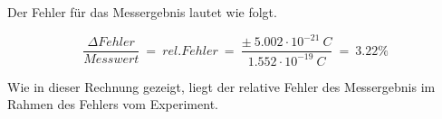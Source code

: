 \noindent Der Fehler für das Messergebnis lautet wie folgt.

$$
\frac{\Delta Fehler}{Messwert} \ = \ rel. Fehler \ = \ \frac{\pm \ 5.002 \cdot 10^{-21}\ C}{1.552 \cdot 10^{-19}\ C} \ = \ 3.22 \%
$$

\noindent Wie in dieser Rechnung gezeigt, liegt der relative Fehler des Messergebnis im Rahmen des Fehlers vom Experiment. 





